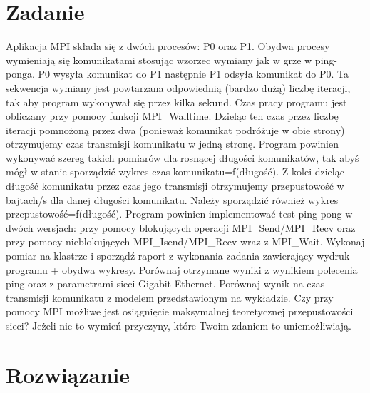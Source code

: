 

\def\titlelinea{Wydział Informatyki}
\def\titlelineb{Katedra Oprogramowania}
\def\titlelinec{Obliczenia równoległe}
\def\titlelined{Temat: Program typu ping-pong}
\def\wykonawca{inż. Rafał Selewońko}
\def\promotor{mgr inż. Paweł Zabielski}
\def\promotorstring{Prowadzący: } 
\def\data{6 grudnia 2013}





\chapter{Zadanie}

Aplikacja MPI składa się z dwóch procesów: P0 oraz P1. Obydwa procesy 
wymieniają się komunikatami stosując wzorzec wymiany jak w grze w ping-ponga. P0 wysyła 
komunikat do P1 następnie P1 odsyła komunikat do P0. Ta sekwencja wymiany jest powtarzana 
odpowiednią (bardzo dużą) liczbę iteracji, tak aby program wykonywał się przez kilka sekund. Czas 
pracy programu jest obliczany przy pomocy funkcji MPI\_Walltime. Dzieląc ten czas przez liczbę 
iteracji pomnożoną przez dwa (ponieważ komunikat podróżuje w obie strony) otrzymujemy czas 
transmisji komunikatu w jedną stronę. Program powinien wykonywać szereg takich pomiarów dla 
rosnącej długości komunikatów, tak abyś mógł w stanie sporządzić wykres 
czas komunikatu=f(długość). Z kolei dzieląc długość komunikatu przez czas jego transmisji otrzymujemy przepustowość w bajtach/s 
dla danej długości komunikatu. Należy sporządzić również wykres przepustowość=f(długość). 
Program powinien implementować test ping-pong w dwóch wersjach: przy pomocy blokujących 
operacji MPI\_Send/MPI\_Recv oraz przy pomocy nieblokujących MPI\_Isend/MPI\_Recv wraz z 
MPI\_Wait. Wykonaj pomiar na klastrze i sporządź raport z wykonania zadania zawierający wydruk 
programu + obydwa wykresy. Porównaj otrzymane wyniki z wynikiem polecenia ping oraz z 
parametrami sieci Gigabit Ethernet. Porównaj wynik na czas transmisji komunikatu z modelem 
przedstawionym na wykładzie. Czy przy pomocy MPI możliwe jest osiągnięcie maksymalnej 
teoretycznej przepustowości sieci? Jeżeli nie to wymień przyczyny, które Twoim zdaniem to 
uniemożliwiają.

\chapter{Rozwiązanie}



